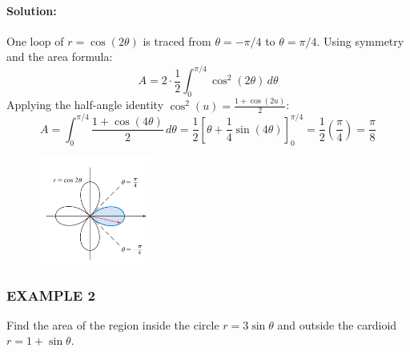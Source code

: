 \documentclass{article}
\begin{document}
\paragraph{Solution:} One loop of $r = \cos(2\theta)$ is traced from $\theta = -\pi/4$ to $\theta = \pi/4$. Using symmetry and the area formula:
\[
A = 2 \cdot \frac{1}{2} \int_{0}^{\pi/4} \cos^2(2\theta) \, d\theta
\]
Applying the half-angle identity $\cos^2(u) = \frac{1 + \cos(2u)}{2}$:
\[
A = \int_{0}^{\pi/4} \frac{1 + \cos(4\theta)}{2} \, d\theta = \frac{1}{2} \left[ \theta + \frac{1}{4}\sin(4\theta) \right]_{0}^{\pi/4} = \frac{1}{2} \left( \frac{\pi}{4} \right) = \frac{\pi}{8}
\]

\begin{figure}[htbp]
    \centering
    \includegraphics[width=0.33\textwidth]{graph46.png}
\end{figure}

\subsubsection*{EXAMPLE 2}
Find the area of the region inside the circle $r = 3\sin\theta$ and outside the cardioid $r = 1 + \sin\theta$.
\end{document}
